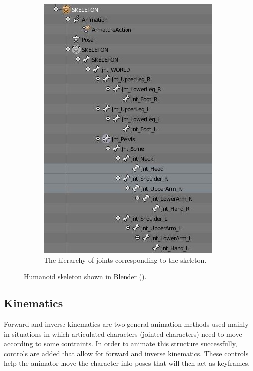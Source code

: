 \begin{figure}[h!]
\begin{subfigure}[b!]{0.4\textwidth}
                \includegraphics[width=\linewidth]{img/skeleton_hierarchy}
                \caption{The hierarchy of joints corresponding to the skeleton.}
                \label{fig:hierarchy}
        \end{subfigure}%
	\caption{Humanoid skeleton shown in Blender (\citep{blender}).}
	\label{fig:rig}
\end{figure}

\subsection{Kinematics}
Forward and inverse kinematics are two general animation methods used mainly in situations in which  articulated characters (jointed characters) need to move according to some contraints. In order to animate this structure successfully, controls are added that allow for forward and inverse kinematics. These controls help the animator move the character into poses that will then act as keyframes.

